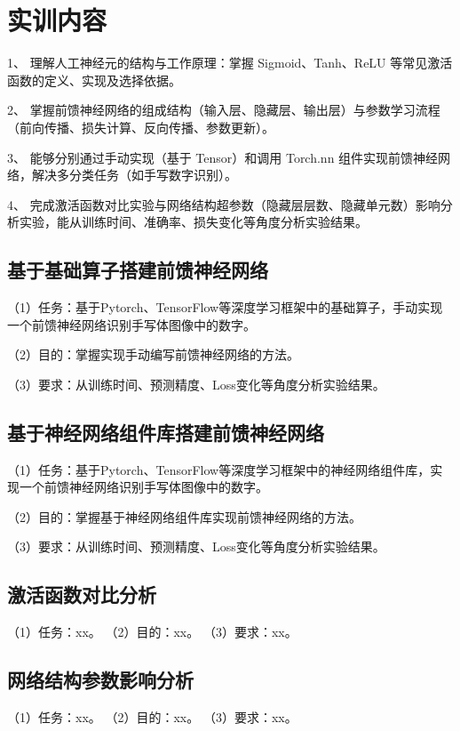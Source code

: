 \documentclass{style/course-report}
\begin{document}
\makecover


\section{实训内容}

1、	理解人工神经元的结构与工作原理：掌握 Sigmoid、Tanh、ReLU 等常见激活函数的定义、实现及选择依据。

2、	掌握前馈神经网络的组成结构（输入层、隐藏层、输出层）与参数学习流程（前向传播、损失计算、反向传播、参数更新）。

3、	能够分别通过手动实现（基于 Tensor）和调用 Torch.nn 组件实现前馈神经网络，解决多分类任务（如手写数字识别）。

4、	完成激活函数对比实验与网络结构超参数（隐藏层层数、隐藏单元数）影响分析实验，能从训练时间、准确率、损失变化等角度分析实验结果。



\subsection{基于基础算子搭建前馈神经网络}
（1）任务：基于Pytorch、TensorFlow等深度学习框架中的基础算子，手动实现一个前馈神经网络识别手写体图像中的数字。

（2）目的：掌握实现手动编写前馈神经网络的方法。

（3）要求：从训练时间、预测精度、Loss变化等角度分析实验结果。

\subsection{基于神经网络组件库搭建前馈神经网络}
（1）任务：基于Pytorch、TensorFlow等深度学习框架中的神经网络组件库，实现一个前馈神经网络识别手写体图像中的数字。

（2）目的：掌握基于神经网络组件库实现前馈神经网络的方法。

（3）要求：从训练时间、预测精度、Loss变化等角度分析实验结果。

\subsection{激活函数对比分析}
（1）任务：xx。
（2）目的：xx。
（3）要求：xx。

\subsection{网络结构参数影响分析}
（1）任务：xx。
（2）目的：xx。
（3）要求：xx。
\end{document}
